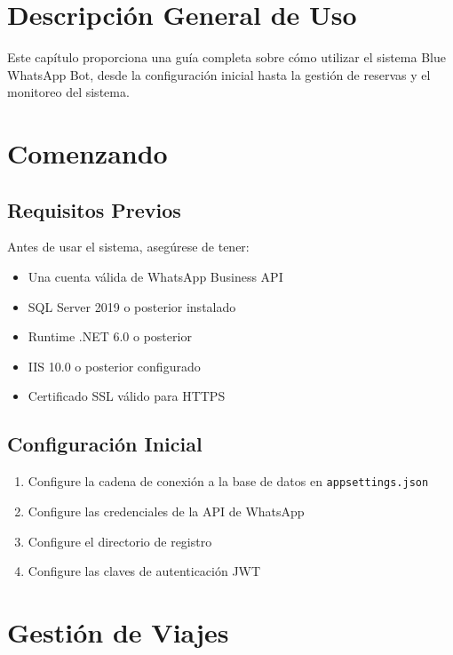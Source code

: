 \section{Descripción General de Uso}
Este capítulo proporciona una guía completa sobre cómo utilizar el sistema Blue WhatsApp Bot, desde la configuración inicial hasta la gestión de reservas y el monitoreo del sistema.

\section{Comenzando}

\subsection{Requisitos Previos}
Antes de usar el sistema, asegúrese de tener:
\begin{itemize}
    \item Una cuenta válida de WhatsApp Business API
    \item SQL Server 2019 o posterior instalado
    \item Runtime .NET 6.0 o posterior
    \item IIS 10.0 o posterior configurado
    \item Certificado SSL válido para HTTPS
\end{itemize}

\subsection{Configuración Inicial}
\begin{enumerate}
    \item Configure la cadena de conexión a la base de datos en \texttt{appsettings.json}
    \item Configure las credenciales de la API de WhatsApp
    \item Configure el directorio de registro
    \item Configure las claves de autenticación JWT
\end{enumerate}

\section{Gestión de Viajes}

